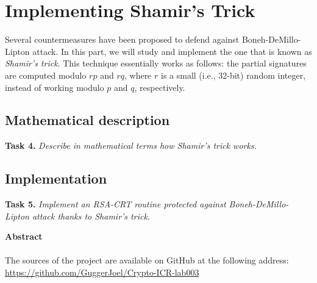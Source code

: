 \documentclass[a4paper]{report}
\begin{document}
\chapter{Implementing Shamir’s Trick}
Several countermeasures have been proposed to defend against Boneh-DeMillo-Lipton attack. In this part, we will study and implement the one that is known as \textit{Shamir’s trick}. This technique essentially works as follows: the partial signatures are computed modulo $rp$ and $rq$, where $r$ is a small (i.e., 32-bit) random integer, instead of working modulo $p$ and $q$, respectively.

\section{Mathematical description}
\textbf{Task 4.} \textit{Describe in mathematical terms how Shamir’s trick works.}

\section{Implementation}
\textbf{Task 5.} \textit{Implement an RSA-CRT routine protected against Boneh-DeMillo-Lipton attack thanks to Shamir’s trick.}


\newpage
\vspace*{6 cm}
\begin{center}
\textbf{Abstract} \\
\ \\
The sources of the project are available on GitHub at the following address: \\
\href{https://github.com/GuggerJoel/Crypto-ICR-lab003}{https://github.com/GuggerJoel/Crypto-ICR-lab003}
\end{center}
\end{document}
